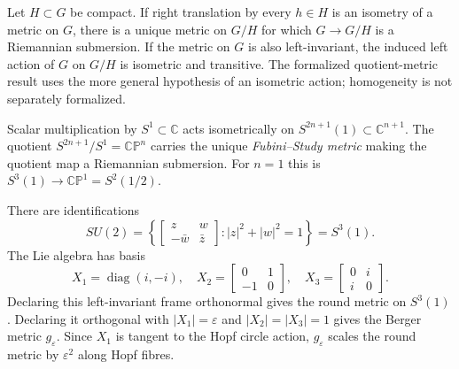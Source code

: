 \begin{remark}
  \label{rem:pet-ch1-quotient-submersion}
  \leanok
  Let $H\subset G$ be compact. If right translation by every $h\in H$ is an
  isometry of a metric on $G$, there is a unique metric on $G/H$ for which
  $G\to G/H$ is a Riemannian submersion. If the metric on $G$ is also
  left-invariant, the induced left action of $G$ on $G/H$ is isometric and
  transitive. The formalized quotient-metric result uses the more general
  hypothesis of an isometric action; homogeneity is not separately formalized.
\end{remark}

\begin{example}
  \label{ex:pet-ch1-fubini-study}
  \leanok
  Scalar multiplication by $S^1\subset\mathbb{C}$ acts isometrically on
  $S^{2n+1}(1)\subset\mathbb{C}^{n+1}$. The quotient
  $S^{2n+1}/S^1=\mathbb{CP}^n$ carries the unique \emph{Fubini--Study metric}
  making the quotient map a Riemannian submersion. For $n=1$ this is
  $S^3(1)\to\mathbb{CP}^1=S^2(1/2)$.
\end{example}

\begin{example}
  \label{ex:pet-ch1-su2-berger}
  \leanok
  There are identifications
  \[
    SU(2)=\left\{\left[\begin{smallmatrix}z&w\\-\bar w&\bar z\end{smallmatrix}\right]
      :|z|^2+|w|^2=1\right\}=S^3(1).
  \]
  The Lie algebra has basis
  \[
    X_1=\operatorname{diag}(i,-i),\quad
    X_2=\left[\begin{smallmatrix}0&1\\-1&0\end{smallmatrix}\right],\quad
    X_3=\left[\begin{smallmatrix}0&i\\i&0\end{smallmatrix}\right].
  \]
  Declaring this left-invariant frame orthonormal gives the round metric on
  $S^3(1)$. Declaring it orthogonal with
  $|X_1|=\varepsilon$ and $|X_2|=|X_3|=1$ gives the Berger metric
  $g_\varepsilon$. Since $X_1$ is tangent to the Hopf circle action,
  $g_\varepsilon$ scales the round metric by $\varepsilon^2$ along Hopf fibres.
\end{example}


